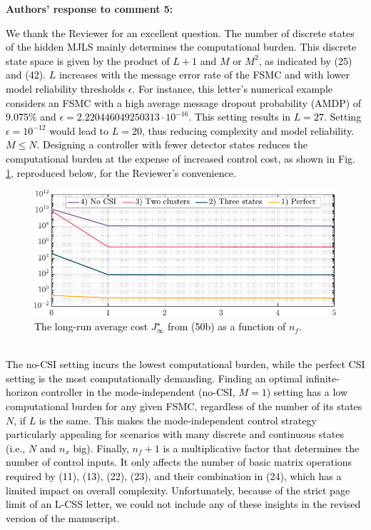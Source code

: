 \begin{bibunit}[alpha]
\textbf{Authors' response to comment 5:} \textcolor{black}{We thank the Reviewer for an excellent question. The number of discrete states of the hidden MJLS mainly determines the computational burden. This discrete state space is given by the product of $L+1$ and $M$ or $M^2$, as indicated by (25) and (42). $L$ increases with the message error rate of the FSMC and with lower model reliability thresholds $\epsilon$. For instance, this letter's numerical example considers an FSMC with a high average message dropout probability (AMDP) of 9.075\% and $\epsilon = 2.220446049250313\cdot 10^{-16}$. This setting results in $L = 27$. Setting  $\epsilon = 10^{-12}$ would lead to $L = 20$, thus reducing complexity and model reliability. $M\leq N$. Designing a controller with fewer detector states reduces the computational burden at the expense of increased control cost, as shown in Fig. \ref{fig:stability-coeff-16}, reproduced below, for the Reviewer's convenience.
\setcounter{figure}{2}
\begin{figure}[h!]
\begin{center}
\includegraphics[width=0.76\columnwidth]{cost-cntrl-a.pdf}
\caption{The long-run average cost $J_{\infty}^{\star}$ from (50b) as a function of $n_f$.}\label{fig:stability-coeff-16}
\end{center}
\end{figure}\\
The no-CSI setting incurs the lowest computational burden, while the perfect CSI setting is the most computationally demanding. Finding an optimal infinite-horizon controller in the mode-independent (no-CSI, $M=1$) setting has a low computational burden for any given FSMC, regardless of the number of its states $N$, if $L$ is the same. This makes the mode-independent control strategy particularly appealing for scenarios with many discrete and continuous states (i.e., $N$ and $n_x$ big). Finally, $n_f+1$ is a multiplicative factor that determines the number of control inputs. It only affects the number of basic matrix operations required by (11), (13), (22), (23), and their combination in (24), which has a limited impact on overall complexity. Unfortunately, because of the strict page limit of an L-CSS letter, we could not include any of these insights in the revised version of the manuscript.}\\[4mm]

\end{bibunit}
